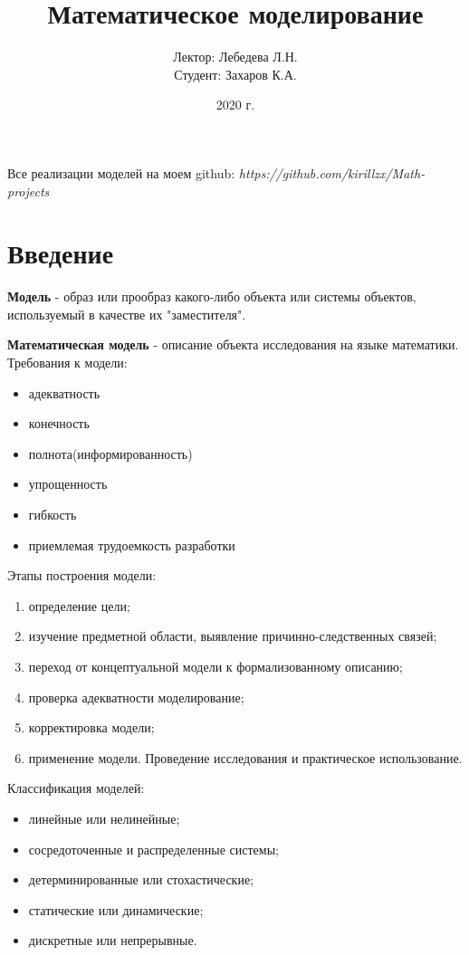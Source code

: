 \documentclass[12pt]{article}
\title{Математическое моделирование}
\author{Лектор: Лебедева Л.Н.\\Студент: Захаров К.А.}
\date{2020 г.}
\theoremstyle{definition}
\theoremstyle{remark}
\begin{document}
\maketitle
Все реализации моделей на моем github: \textit{https://github.com/kirillzx/Math-projects}
\tableofcontents

\section{Введение}
\textbf{Модель} - образ или прообраз какого-либо объекта или системы объектов, используемый в качестве их "заместителя".

\textbf{Математическая модель} - описание объекта исследования на языке математики.\\
Требования к модели:
\begin{itemize}
  \item адекватность
  \item конечность
  \item полнота(информированность)
  \item упрощенность
  \item гибкость
  \item приемлемая трудоемкость разработки
\end{itemize}
Этапы построения модели:
\begin{enumerate}
  \item определение цели;
  \item изучение предметной области, выявление причинно-следственных связей;
  \item переход от концептуальной модели к формализованному описанию;
  \item проверка адекватности моделирование;
  \item корректировка модели;
  \item применение модели. Проведение исследования и практическое использование.
\end{enumerate}
Классификация моделей:
\begin{itemize}
  \item линейные или нелинейные;
  \item сосредоточенные и распределенные системы;
  \item детерминированные или стохастические;
  \item статические или динамические;
  \item дискретные или непрерывные.
\end{itemize}




\end{document}
